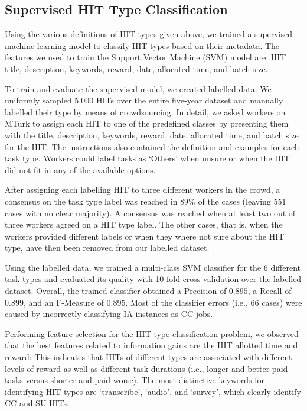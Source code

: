 \subsection{Supervised HIT Type Classification}
Using the various definitions of HIT types given above, we trained a supervised machine learning model to classify HIT types based on their metadata. The features we used to train the Support Vector Machine (SVM) model are: HIT title, description, keywords, reward, date, allocated time, and batch size.

To train and evaluate the supervised model, we created labelled data: We uniformly sampled 5,000 HITs over the entire five-year dataset and manually labelled their type by means of crowdsourcing. In detail, we asked workers on MTurk to assign each HIT to one of the predefined classes by presenting them with the title, description, keywords, reward, date, allocated time, and batch size for the HIT. The instructions also contained the definition and examples for each task type. Workers could label tasks as `Others' when unsure or when the HIT did not fit in any of the available options.

After assigning each labelling HIT to three different workers in the crowd, a consensus on the task type label was reached in $89\%$ of the cases (leaving 551 cases with no clear majority). A consensus was reached when at least two out of three workers agreed on a HIT type label. The other cases, that is, when the workers provided different labels or when they where not sure about the HIT type, have then been removed from our labelled dataset.

Using the labelled data, we trained a multi-class SVM classifier for the 6 different task types and evaluated its quality with 10-fold cross validation over the labelled dataset. Overall, the trained classifier obtained a Precision of $0.895$, a Recall of $0.899$, and an F-Measure of $0.895$. Most of the classifier errors (i.e., 66 cases) were caused by incorrectly classifying IA instances as CC jobs.

Performing feature selection for the HIT type classification problem, we observed that the best features related to information gains are the HIT allotted time and reward: This indicates that HITs of different types are associated with different levels of reward as well as different task durations (i.e., longer and better paid tasks versus shorter and paid worse). 
The most distinctive keywords for identifying HIT types are `transcribe', `audio', and `survey', which clearly identify CC and SU HITs.
 
